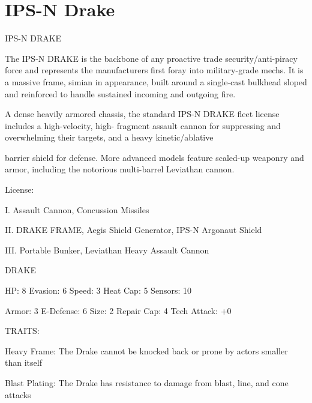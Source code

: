\section{IPS-N Drake}

                                                                                                                                 
                                                    IPS-N DRAKE  

The IPS-N DRAKE is the backbone of any proactive trade security/anti-piracy force and represents the  
manufacturers first foray into military-grade mechs. It is a massive frame, simian in appearance, built  
around a single-cast bulkhead sloped and reinforced to handle sustained incoming and outgoing fire.    

A dense heavily armored chassis, the standard IPS-N DRAKE fleet license includes a high-velocity, high- 
fragment assault cannon for suppressing and overwhelming their targets, and a heavy kinetic/ablative  

barrier shield for defense. More advanced models feature scaled-up weaponry and armor, including the  
notorious multi-barrel Leviathan cannon.  

                                                                                                                           


                                                     License:
 
I. Assault Cannon, Concussion Missiles
 
II. DRAKE FRAME, Aegis Shield Generator, IPS-N Argonaut Shield
 
III. Portable Bunker, Leviathan Heavy Assault Cannon
 

                                                     DRAKE 

  HP: 8           Evasion: 6                             Speed: 3            Heat Cap: 5        Sensors: 10 

  Armor: 3        E-Defense: 6                           Size: 2             Repair Cap: 4      Tech Attack:  
                                                                                                +0 

                                                     TRAITS: 

  Heavy Frame: The Drake cannot be knocked back or prone by actors smaller than itself
 
  Blast Plating: The Drake has resistance to damage from blast, line, and cone attacks
 
